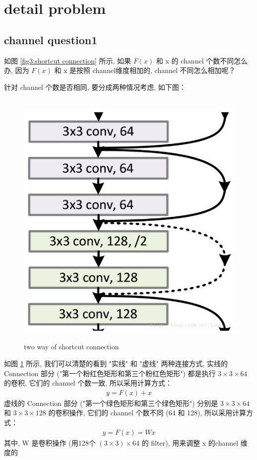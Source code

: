 \documentclass[12pt]{ctexart}%
\begin{document}
	\section{\quad detail problem}
		\subsection{\quad channel question1}
			如图 \ref{fig3:shortcut connection} 所示, 如果 $F(x)$ 和 x 的 channel 个数不同怎么办, 因为 $F(x)$ 和 x 是按照 channel维度相加的, channel 不同怎么相加呢？
			
			\quad 针对 channel 个数是否相同, 要分成两种情况考虑, 如下图：
				\begin{figure}[H]
					\vspace{-0.2cm}  %
					\setlength{\abovecaptionskip}{-0.2cm}   %
					\centering
					\includegraphics[scale=0.6]{shortcut_connection.png}
					\renewcommand{\figurename}{Fig} %
					\caption{two way of shortcut connection}
					\label{fig5:shortcut_connection}
				\end{figure}
			如图 \ref{fig5:shortcut_connection} 所示, 我们可以清楚的看到 "实线" 和 "虚线" 两种连接方式, 实线的 Connection 部分 ("第一个粉红色矩形和第三个粉红色矩形") 都是执行 $3\times 3 \times 64$ 的卷积, 它们的 channel 个数一致, 所以采用计算方式：
				\begin{align}
					y = F(x) + x
				\end{align}
			\qquad 虚线的 Connection 部分 ("第一个绿色矩形和第三个绿色矩形") 分别是 $3\times 3 \times 64$ 和 $3\times 3 \times 128$ 的卷积操作, 它们的 channel 个数不同 (64 和 128), 所以采用计算方式：
				\begin{align}
					y = F(x) = Wx
				\end{align}
			其中, W 是卷积操作 (用128个 $(3\times 3)\times 64$ 的 filter), 用来调整 x 的channel 维度的
			
\end{document}
